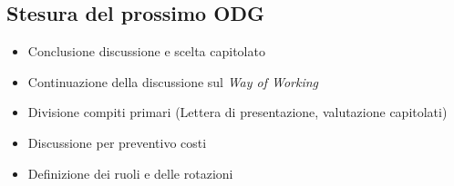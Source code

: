 \documentclass[a4paper, 10pt, colorlinks=true, linkcolor=black, urlcolor=blue, citecolor=blue, hidelinks]{article}
\begin{document}
\subsection{Stesura del prossimo ODG}
\begin{itemize}
    \item Conclusione discussione e scelta capitolato 
    \item Continuazione della discussione sul \textit{Way of Working}
    \item Divisione compiti primari (Lettera di presentazione, valutazione capitolati)
    \item Discussione per preventivo costi 
    \item Definizione dei ruoli e delle rotazioni
\end{itemize}

\appendix
\end{document}
